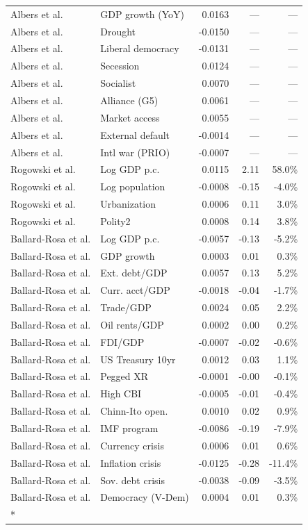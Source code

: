 \documentclass[
]{article}
\begin{document}
\begin{longtable}[t]{llrrr}
Albers et al. & GDP growth (YoY) & 0.0163 & --- & ---\\
Albers et al. & Drought & -0.0150 & --- & ---\\
Albers et al. & Liberal democracy & -0.0131 & --- & ---\\
Albers et al. & Secession & 0.0124 & --- & ---\\
\addlinespace
Albers et al. & Socialist & 0.0070 & --- & ---\\
Albers et al. & Alliance (G5) & 0.0061 & --- & ---\\
Albers et al. & Market access & 0.0055 & --- & ---\\
Albers et al. & External default & -0.0014 & --- & ---\\
Albers et al. & Intl war (PRIO) & -0.0007 & --- & ---\\
\addlinespace
Rogowski et al. & Log GDP p.c. & 0.0115 & 2.11 & 58.0\%\\
Rogowski et al. & Log population & -0.0008 & -0.15 & -4.0\%\\
Rogowski et al. & Urbanization & 0.0006 & 0.11 & 3.0\%\\
Rogowski et al. & Polity2 & 0.0008 & 0.14 & 3.8\%\\
Ballard-Rosa et al. & Log GDP p.c. & -0.0057 & -0.13 & -5.2\%\\
\addlinespace
Ballard-Rosa et al. & GDP growth & 0.0003 & 0.01 & 0.3\%\\
Ballard-Rosa et al. & Ext. debt/GDP & 0.0057 & 0.13 & 5.2\%\\
Ballard-Rosa et al. & Curr. acct/GDP & -0.0018 & -0.04 & -1.7\%\\
Ballard-Rosa et al. & Trade/GDP & 0.0024 & 0.05 & 2.2\%\\
Ballard-Rosa et al. & Oil rents/GDP & 0.0002 & 0.00 & 0.2\%\\
\addlinespace
Ballard-Rosa et al. & FDI/GDP & -0.0007 & -0.02 & -0.6\%\\
Ballard-Rosa et al. & US Treasury 10yr & 0.0012 & 0.03 & 1.1\%\\
Ballard-Rosa et al. & Pegged XR & -0.0001 & -0.00 & -0.1\%\\
Ballard-Rosa et al. & High CBI & -0.0005 & -0.01 & -0.4\%\\
Ballard-Rosa et al. & Chinn-Ito open. & 0.0010 & 0.02 & 0.9\%\\
\addlinespace
Ballard-Rosa et al. & IMF program & -0.0086 & -0.19 & -7.9\%\\
Ballard-Rosa et al. & Currency crisis & 0.0006 & 0.01 & 0.6\%\\
Ballard-Rosa et al. & Inflation crisis & -0.0125 & -0.28 & -11.4\%\\
Ballard-Rosa et al. & Sov. debt crisis & -0.0038 & -0.09 & -3.5\%\\
Ballard-Rosa et al. & Democracy (V-Dem) & 0.0004 & 0.01 & 0.3\%\\*
\end{longtable}
\endgroup{}
\end{document}
